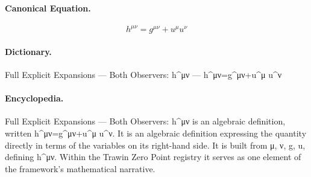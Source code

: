 \paragraph{Canonical Equation.}
\[
h^{\mu\nu}=g^{\mu\nu}+u^\mu u^\nu
\]

\paragraph{Dictionary.}
Full Explicit Expansions — Both Observers: h\textasciicircum{}μν — h\textasciicircum{}μν=g\textasciicircum{}μν+u\textasciicircum{}μ u\textasciicircum{}ν

\paragraph{Encyclopedia.}
Full Explicit Expansions — Both Observers: h\textasciicircum{}μν is an algebraic definition, written h\textasciicircum{}μν=g\textasciicircum{}μν+u\textasciicircum{}μ u\textasciicircum{}ν. It is an algebraic definition expressing the quantity directly in terms of the variables on its right-hand side. It is built from μ, ν, g, u, defining h\textasciicircum{}μν. Within the Trawin Zero Point registry it serves as one element of the framework's mathematical narrative.
